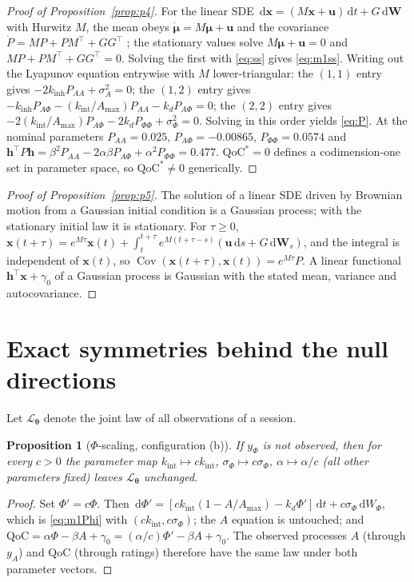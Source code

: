 \documentclass[12pt,a4paper]{article}
\theoremstyle{plain}
\newtheorem{proposition}[theorem]{Proposition}
\theoremstyle{definition}
\theoremstyle{remark}
\newcommand{\QoC}{\mathrm{QoC}}
\newcommand{\kinh}{k_{\mathrm{inh}}}
\newcommand{\kint}{k_{\mathrm{int}}}
\newcommand{\kd}{k_{d}}
\newcommand{\Amax}{A_{\max}}
\newcommand{\sA}{\sigma_{A}}
\newcommand{\sPhi}{\sigma_{\Phi}}
\renewcommand{\dd}{\,\mathrm{d}}   %
\newcommand{\Cov}{\operatorname{Cov}}
\newcommand{\thetav}{\boldsymbol{\theta}}
\newcommand{\muv}{\boldsymbol{\mu}}
\newcommand{\xv}{\mathbf{x}}
\newcommand{\hv}{\mathbf{h}}
\newcommand{\uv}{\mathbf{u}}
\begin{document}
\begin{proof}[Proof of Proposition~\ref{prop:p4}]
For the linear SDE $\dd\xv=(M\xv+\uv)\dd t+G\dd\mathbf W$ with Hurwitz $M$, the mean obeys $\dot{\muv}=M\muv+\uv$ and the covariance $\dot P=MP+PM^\top+GG^\top$ \citep{Gardiner2009}; the stationary values solve $M\muv+\uv=0$ and $MP+PM^\top+GG^\top=0$. Solving the first with \eqref{eq:ss} gives \eqref{eq:m1ss}. Writing out the Lyapunov equation entrywise with $M$ lower-triangular: the $(1,1)$ entry gives $-2\kinh P_{AA}+\sA^2=0$; the $(1,2)$ entry gives $-\kinh P_{A\Phi}-(\kint/\Amax)P_{AA}-\kd P_{A\Phi}=0$; the $(2,2)$ entry gives $-2(\kint/\Amax)P_{A\Phi}-2\kd P_{\Phi\Phi}+\sPhi^2=0$. Solving in this order yields \eqref{eq:P}. At the nominal parameters $P_{AA}=0.025$, $P_{A\Phi}=-0.00865$, $P_{\Phi\Phi}=0.0574$ and $\hv^\top P\hv=\beta^2P_{AA}-2\alpha\beta P_{A\Phi}+\alpha^2P_{\Phi\Phi}=0.477$. $\QoC^*=0$ defines a codimension-one set in parameter space, so $\QoC^*\neq0$ generically.
\end{proof}

\begin{proof}[Proof of Proposition~\ref{prop:p5}]
The solution of a linear SDE driven by Brownian motion from a Gaussian initial condition is a Gaussian process; with the stationary initial law it is stationary. For $\tau\ge0$, $\xv(t+\tau)=e^{M\tau}\xv(t)+\int_t^{t+\tau}e^{M(t+\tau-s)}(\uv\dd s+G\dd\mathbf W_s)$, and the integral is independent of $\xv(t)$, so $\Cov(\xv(t+\tau),\xv(t))=e^{M\tau}P$. A linear functional $\hv^\top\xv+\gamma_0$ of a Gaussian process is Gaussian with the stated mean, variance and autocovariance.
\end{proof}

\section{Exact symmetries behind the null directions}
\label{app:symmetry}

Let $\mathcal L_{\thetav}$ denote the joint law of all observations of a session.

\begin{proposition}[$\Phi$-scaling, configuration (b)]
If $y_\Phi$ is not observed, then for every $c>0$ the parameter map $\kint\mapsto c\kint$, $\sPhi\mapsto c\sPhi$, $\alpha\mapsto\alpha/c$ (all other parameters fixed) leaves $\mathcal L_{\thetav}$ unchanged.
\end{proposition}
\begin{proof}
Set $\Phi'=c\Phi$. Then $\dd\Phi'=[c\kint(1-A/\Amax)-\kd\Phi']\dd t+c\sPhi\dd W_\Phi$, which is \eqref{eq:m1Phi} with $(c\kint,c\sPhi)$; the $A$ equation is untouched; and $\QoC=\alpha\Phi-\beta A+\gamma_0=(\alpha/c)\Phi'-\beta A+\gamma_0$. The observed processes $A$ (through $y_A$) and $\QoC$ (through ratings) therefore have the same law under both parameter vectors.
\end{proof}
\end{document}
